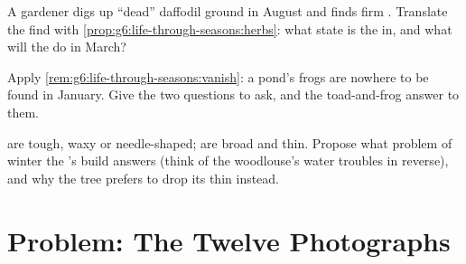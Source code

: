 \begin{exercise}[$\star\star$]\label{exo:g6:life-through-seasons:10}
A gardener digs up ``dead'' daffodil ground in August and
finds firm . Translate the find with
\cref{prop:g6:life-through-seasons:herbs}: what state is
the  in, and what will the  do in March?
\end{exercise}

\begin{exercise}[$\star\star$]\label{exo:g6:life-through-seasons:11}
Apply \cref{rem:g6:life-through-seasons:vanish}: a pond's
frogs are nowhere to be found in January. Give the two
questions to ask, and the toad-and-frog answer to them.
\end{exercise}

\begin{exercise}[$\star\star\star$]\label{exo:g6:life-through-seasons:12}
  are tough, waxy or needle-shaped;
  are broad and thin. Propose what problem
of winter the  's build answers (think of the
woodlouse's water troubles in reverse), and why the
 tree prefers to drop its thin  instead.
\end{exercise}

\section{Problem: The Twelve Photographs}

